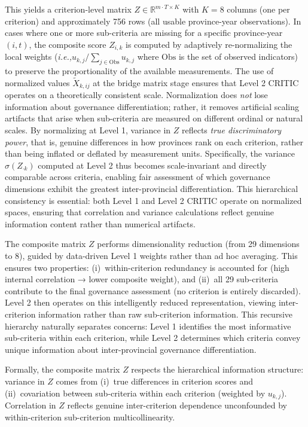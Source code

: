\documentclass[12pt,a4paper]{article}
\newcommand{\ie}{\textit{i.e.,}\xspace}
\begin{document}
This yields a criterion-level matrix $Z \in \mathbb{R}^{m \cdot T \times K}$ with $K = 8$ columns (one per criterion) and approximately 756 rows (all usable province-year observations). In cases where one or more sub-criteria are missing for a specific province-year $(i, t)$, the composite score $Z_{i,k}$ is computed by adaptively re-normalizing the local weights (\ie $u_{k,j} / \sum_{j \in \text{Obs}} u_{k,j}$ where $\text{Obs}$ is the set of observed indicators) to preserve the proportionality of the available measurements. The use of normalized values $\tilde{X}_{k,ij}$ at the bridge matrix stage ensures that Level 2 CRITIC operates on a theoretically consistent scale. Normalization does \emph{not} lose information about governance differentiation; rather, it removes artificial scaling artifacts that arise when sub-criteria are measured on different ordinal or natural scales. By normalizing at Level 1, variance in $Z$ reflects \emph{true discriminatory power}, that is, genuine differences in how provinces rank on each criterion, rather than being inflated or deflated by measurement units. Specifically, the variance $\sigma(Z_{\cdot k})$ computed at Level 2 thus becomes scale-invariant and directly comparable across criteria, enabling fair assessment of which governance dimensions exhibit the greatest inter-provincial differentiation. This hierarchical consistency is essential: both Level 1 and Level 2 CRITIC operate on normalized spaces, ensuring that correlation and variance calculations reflect genuine information content rather than numerical artifacts.

The composite matrix $Z$ performs dimensionality reduction (from 29 dimensions to 8), guided by data-driven Level 1 weights rather than ad hoc averaging. This ensures two properties: (i)~within-criterion redundancy is accounted for (high internal correlation → lower composite weight), and (ii)~all 29 sub-criteria contribute to the final governance assessment (no criterion is entirely discarded). Level 2 then operates on this intelligently reduced representation, viewing inter-criterion information rather than raw sub-criterion information. This recursive hierarchy naturally separates concerns: Level 1 identifies the most informative sub-criteria within each criterion, while Level 2 determines which criteria convey unique information about inter-provincial governance differentiation.

Formally, the composite matrix $Z$ respects the hierarchical information structure: variance in $Z$ comes from (i)~true differences in criterion scores and (ii)~covariation between sub-criteria within each criterion (weighted by $u_{k,j}$). Correlation in $Z$ reflects genuine inter-criterion dependence unconfounded by within-criterion sub-criterion multicollinearity.
\end{document}
